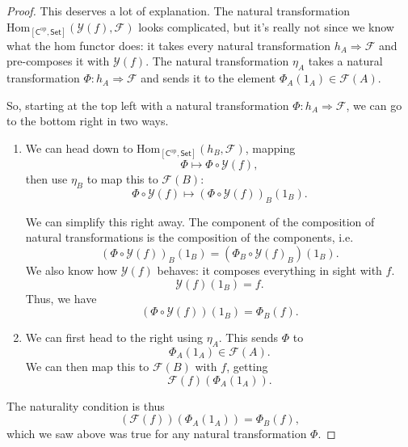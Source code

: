 \documentclass[a4paper,10pt]{scrreprt}
\newcommand{\Hom}{\mathrm{Hom}}
\theoremstyle{definition}
\theoremstyle{plain}
\theoremstyle{remark}
\begin{document}
\begin{proof}
  This deserves a lot of explanation. The natural transformation $\Hom_{[\mathsf{C}^{\text{op}}, \mathsf{Set}]}(\mathcal{Y}(f), \mathcal{F})$ looks complicated, but it's really not since we know what the hom functor does: it takes every natural transformation $h_{A} \Rightarrow \mathcal{F}$ and pre-composes it with $\mathcal{Y}(f)$. The natural transformation $\eta_{A}$ takes a natural transformation $\Phi\colon h_{A} \Rightarrow \mathcal{F}$ and sends it to the element $\Phi_{A}(1_{A}) \in \mathcal{F}(A)$.

  So, starting at the top left with a natural transformation $\Phi\colon h_{A} \Rightarrow \mathcal{F}$, we can go to the bottom right in two ways.
  \begin{enumerate}
    \item We can head down to $\Hom_{[\mathsf{C}^{\text{op}}, \mathsf{Set}]}(h_{B}, \mathcal{F})$, mapping 
      \begin{equation*}
        \Phi \mapsto \Phi \circ \mathcal{Y}(f),
      \end{equation*}
      then use $\eta_{B}$ to map this to $\mathcal{F}(B)$:
      \begin{equation*}
        \Phi \circ \mathcal{Y}(f) \mapsto (\Phi \circ \mathcal{Y}(f))_{B}(1_{B}).
      \end{equation*}

      We can simplify this right away. The component of the composition of natural transformations is the composition of the components, i.e.
      \begin{equation*}
        (\Phi \circ \mathcal{Y}(f))_{B}(1_{B}) = (\Phi_{B} \circ \mathcal{Y}(f)_{B})(1_{B}).
      \end{equation*}
      We also know how $\mathcal{Y}(f)$ behaves: it composes everything in sight with $f$.
      \begin{equation*}
        \mathcal{Y}(f)(1_{B}) = f.
      \end{equation*}
      Thus, we have
      \begin{equation*}
        (\Phi \circ \mathcal{Y}(f))(1_{B}) = \Phi_{B}(f).
      \end{equation*}

    \item We can first head to the right using $\eta_{A}$. This sends $\Phi$ to 
      \begin{equation*}
        \Phi_{A}(1_{A}) \in \mathcal{F}(A).
      \end{equation*}
      We can then map this to $\mathcal{F}(B)$ with $f$, getting
      \begin{equation*}
        \mathcal{F}(f)(\Phi_{A}(1_{A})).
      \end{equation*}
  \end{enumerate}

  The naturality condition is thus
  \begin{equation*}
    (\mathcal{F}(f))(\Phi_{A}(1_{A})) = \Phi_{B}(f),
  \end{equation*}
  which we saw above was true for any natural transformation $\Phi$.
\end{proof}
\end{document}
